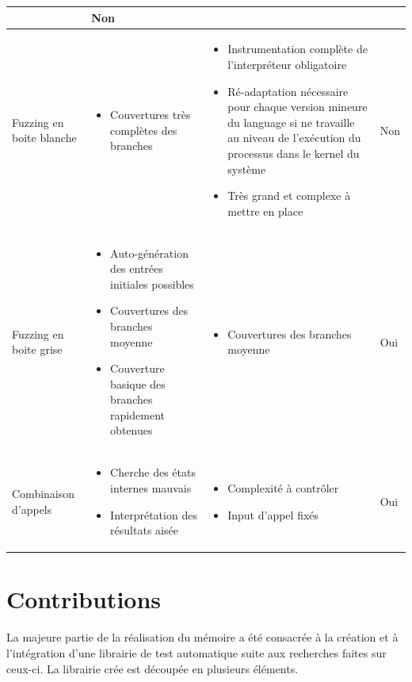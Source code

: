 \documentclass[a4paper]{report}
\begin{document}
\begin{landscape}
\begin{tabularx}{1\linewidth}{>{\centering}p{}||p{}|p{}|p{}}
\begin{itemize}
	\end{itemize}
	 & Non \\ 
	\hline   
	Fuzzing en boite blanche & 
	\begin{itemize}
	\item Couvertures très complètes des branches
	\end{itemize}
	 & 
	\begin{itemize}
	\item Instrumentation complète de l'interpréteur obligatoire
	\item Ré-adaptation nécessaire pour chaque version mineure du language si ne travaille au niveau de l'exécution du processus dans le kernel du système
	\item Très grand et complexe à mettre en place 
	\end{itemize}
	 & Non \\ 
	\hline   
	Fuzzing en boite grise & 
	\begin{itemize}
	\item Auto-génération des entrées initiales possibles
	\item Couvertures des branches moyenne
	\item Couverture basique des branches rapidement obtenues
	\end{itemize}
	 & 
	\begin{itemize}
	\item Couvertures des branches moyenne
	\end{itemize}
	 & Oui \\ 
	\hline   
	Combinaison d'appels & 
	\begin{itemize}
	\item Cherche des états internes mauvais
	\item  Interprétation des résultats aisée
	\end{itemize}
	 & 
	\begin{itemize}
	\item Complexité à contrôler
	\item Input d'appel fixés
	\end{itemize}
	 & Oui \\ 
	\hline 
	\end{tabularx}
\end{landscape}
\restoregeometry 



\chapter{Contributions}
La majeure partie de la réalisation du mémoire a été consacrée à la création et à l'intégration d'une librairie de test automatique suite aux recherches faites sur ceux-ci.
La librairie crée est découpée en plusieurs éléments.
\end{document}
